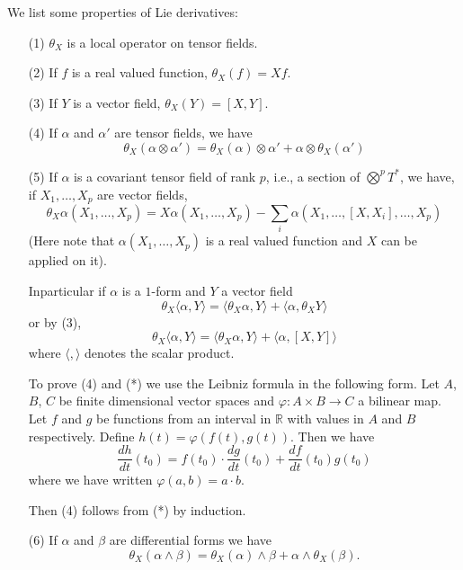 We list some properties of Lie derivatives:
\begin{itemize}
\item[(1)] $\theta_{X}$ is a local operator on tensor fields.

\item[(2)] If $f$ is a real valued function, $\theta_{X}(f)=Xf$.

\item[(3)] If $Y$ is a vector field, $\theta_{X}(Y)=[X,Y]$.

\item[(4)] If $\alpha$ and $\alpha'$ are tensor fields, we have
$$
\theta_{X}(\alpha\otimes \alpha')=\theta_{X}(\alpha)\otimes \alpha'+\alpha\otimes\theta_{X}(\alpha')
$$

\item[(5)] If\label{page27} $\alpha$ is a covariant tensor field of rank $p$, i.e., a section of $\bigotimes\limits^{p}T^{*}$, we have, if $X_{1},\ldots,X_{p}$ are vector fields,
$$
\theta_{X}\alpha(X_{1},\ldots,X_{p})=X\alpha(X_{1},\ldots,X_{p})-\sum\limits_{i}\alpha(X_{1},\ldots,[X,X_{i}],\ldots,X_{p})
$$
(Here note that $\alpha(X_{1},\ldots,X_{p})$ is a real valued function and $X$ can be applied on it).

In\pageoriginale particular if $\alpha$ is a $1$-form and $Y$ a vector field
$$
\theta_{X}\langle \alpha, Y\rangle=\langle \theta_{X}\alpha,Y\rangle+\langle \alpha,\theta_{X}Y\rangle
$$
or by (3),
\begin{equation*}
\theta_{X}\langle \alpha,Y\rangle = \langle \theta_{X}\alpha,Y\rangle + \langle \alpha,[X,Y]\rangle\tag{*}
\end{equation*}\label{page28}
where $\langle,\rangle$ denotes the scalar product.

To prove (4) and (*) we use the Leibniz formula in the following form. Let $A$, $B$, $C$ be finite dimensional vector spaces and $\varphi:A\times B\to C$ a bilinear map. Let $f$ and $g$ be functions from an interval in $\mathbb{R}$ with values in $A$ and $B$ respectively. Define $h(t)=\varphi(f(t),g(t))$. Then we have
$$
\dfrac{dh}{dt}(t_{0})=f(t_{0})\cdot \dfrac{dg}{dt}(t_{0})+\dfrac{df}{dt}(t_{0})g(t_{0})
$$
where we have written $\varphi(a,b)=a\cdot b$.

Then (4) follows from (*) by induction.

\item[(6)] If $\alpha$ and $\beta$ are differential forms we have
$$
\theta_{X}(\alpha\wedge \beta)=\theta_{X}(\alpha)\wedge\beta+\alpha\wedge \theta_{X}(\beta).
$$ 
\end{itemize}

